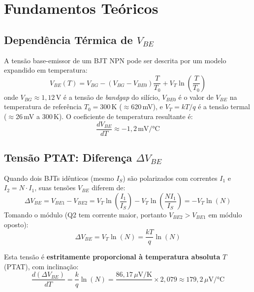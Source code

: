 \documentclass[12pt,a4paper]{article}
\begin{document}
\section{Fundamentos Teóricos}

\subsection{Dependência Térmica de $V_{BE}$}

A tensão base-emissor de um BJT NPN pode ser descrita por um modelo expandido em temperatura:
\begin{equation}
  V_{BE}(T) = V_{BG} - \left(V_{BG} - V_{BE0}\right)\frac{T}{T_0}
              + V_T \ln\!\left(\frac{T}{T_0}\right)
  \label{eq:vbe_t}
\end{equation}
onde $V_{BG} \approx 1{,}12$\,V é a tensão de \textit{bandgap} do silício, $V_{BE0}$ é
o valor de $V_{BE}$ na temperatura de referência $T_0 = 300$\,K ($\approx$620\,mV),
e $V_T = kT/q$ é a tensão termal ($\approx$26\,mV a 300\,K). O coeficiente de temperatura
resultante é:
\begin{equation}
  \frac{dV_{BE}}{dT} \approx -1{,}2\,\text{mV/°C}
\end{equation}

\subsection{Tensão PTAT: Diferença $\Delta V_{BE}$}

Quando dois BJTs idênticos (mesmo $I_S$) são polarizados com correntes $I_1$ e $I_2 = N \cdot I_1$,
suas tensões $V_{BE}$ diferem de:
\begin{equation}
  \Delta V_{BE} = V_{BE1} - V_{BE2}
    = V_T \ln\!\left(\frac{I_1}{I_S}\right) - V_T \ln\!\left(\frac{NI_1}{I_S}\right)
    = -V_T \ln(N)
\end{equation}
Tomando o módulo (Q2 tem corrente maior, portanto $V_{BE2} > V_{BE1}$ em módulo oposto):
\begin{equation}
  \boxed{\Delta V_{BE} = V_T \ln(N) = \frac{kT}{q}\ln(N)}
  \label{eq:dvbe}
\end{equation}

Esta tensão é \textbf{estritamente proporcional à temperatura absoluta} $T$ (PTAT), com
inclinação:
\begin{equation}
  \frac{d(\Delta V_{BE})}{dT} = \frac{k}{q}\ln(N)
    = \frac{86{,}17\,\mu\text{V/K}}{\text{}} \times 2{,}079
    \approx 179{,}2\,\mu\text{V/°C}
\end{equation}
\end{document}

